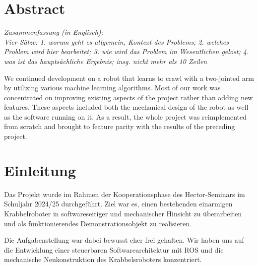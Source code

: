 \section*{Abstract}

\textit{Zusammenfassung (in Englisch); \\ Vier Sätze: 1. worum geht es allgemein, Kontext des Problems; 2. welches Problem wird hier bearbeitet; 3. wie wird das Problem im Wesentlichen gelöst; 4. was ist das hauptsächliche Ergebnis; insg. nicht mehr als 10 Zeilen}

We continued development on a robot that learns to crawl with a two-jointed arm by utilizing various machine learning algorithms. Most of our work was concentrated on improving existing aspects of the project rather than adding new features. These aspects included both the mechanical design of the robot as well as the software running on it. As a result, the whole project was reimplemented from scratch and brought to feature parity with the results of the preceding project.

\section{Einleitung}

Das Projekt wurde im Rahmen der Kooperationsphase des Hector-Seminars im Schuljahr 2024/25 durchgeführt. 
Ziel war es, einen bestehenden einarmigen Krabbelroboter in softwareseitiger und mechanischer Hinsicht zu überarbeiten und als funktionierendes Demonstrationsobjekt zu realisieren.

Die Aufgabenstellung war dabei bewusst eher frei gehalten. Wir haben uns auf die Entwicklung einer steuerbaren Softwarearchitektur mit ROS und die mechanische Neukonstruktion des Krabbelsroboters konzentriert. 
